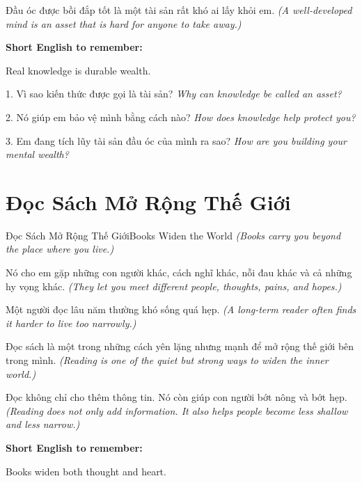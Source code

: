 \begin{baihoc}
Đầu óc được bồi đắp tốt là một tài sản rất khó ai lấy khỏi em.
\textit{(A well-developed mind is an asset that is hard for anyone to take away.)}
\end{baihoc}

\begin{ghinhoanh}
\textbf{Short English to remember:}

Real knowledge is durable wealth.

\end{ghinhoanh}

\begin{tuhocnhanh}
1. Vì sao kiến thức được gọi là tài sản? \textit{Why can knowledge be called an asset?}

2. Nó giúp em bảo vệ mình bằng cách nào? \textit{How does knowledge help protect you?}

3. Em đang tích lũy tài sản đầu óc của mình ra sao? \textit{How are you building your mental wealth?}
\end{tuhocnhanh}
\ngancach

\section{Đọc Sách Mở Rộng Thế Giới}
\begin{truyen}{Đọc Sách Mở Rộng Thế Giới}{Books Widen the World}
\textit{(Books carry you beyond the place where you live.)}

Nó cho em gặp những con người khác, cách nghĩ khác, nỗi đau khác và cả những hy vọng khác.
\textit{(They let you meet different people, thoughts, pains, and hopes.)}

Một người đọc lâu năm thường khó sống quá hẹp.
\textit{(A long-term reader often finds it harder to live too narrowly.)}

Đọc sách là một trong những cách yên lặng nhưng mạnh để mở rộng thế giới bên trong mình.
\textit{(Reading is one of the quiet but strong ways to widen the inner world.)}
\end{truyen}

\begin{baihoc}
Đọc không chỉ cho thêm thông tin. Nó còn giúp con người bớt nông và bớt hẹp.
\textit{(Reading does not only add information. It also helps people become less shallow and less narrow.)}
\end{baihoc}

\begin{ghinhoanh}
\textbf{Short English to remember:}

Books widen both thought and heart.

\end{ghinhoanh}

